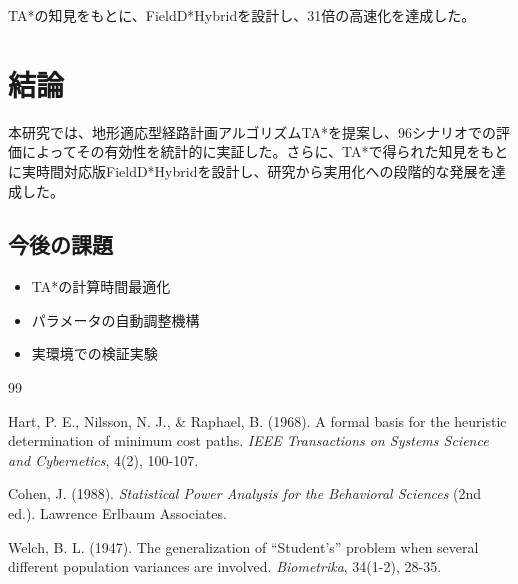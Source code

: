 \documentclass[12pt,a4paper]{article}
\begin{document}
TA*の知見をもとに、FieldD*Hybridを設計し、31倍の高速化を達成した。

\section{結論}

本研究では、地形適応型経路計画アルゴリズムTA*を提案し、96シナリオでの評価によってその有効性を統計的に実証した。さらに、TA*で得られた知見をもとに実時間対応版FieldD*Hybridを設計し、研究から実用化への段階的な発展を達成した。

\subsection{今後の課題}

\begin{itemize}
    \item TA*の計算時間最適化
    \item パラメータの自動調整機構
    \item 実環境での検証実験
\end{itemize}

\begin{thebibliography}{99}

Hart, P. E., Nilsson, N. J., \& Raphael, B. (1968).
A formal basis for the heuristic determination of minimum cost paths.
\textit{IEEE Transactions on Systems Science and Cybernetics}, 4(2), 100-107.

Cohen, J. (1988).
\textit{Statistical Power Analysis for the Behavioral Sciences} (2nd ed.).
Lawrence Erlbaum Associates.

Welch, B. L. (1947).
The generalization of ``Student's'' problem when several different population variances are involved.
\textit{Biometrika}, 34(1-2), 28-35.

\end{thebibliography}
\end{document}
